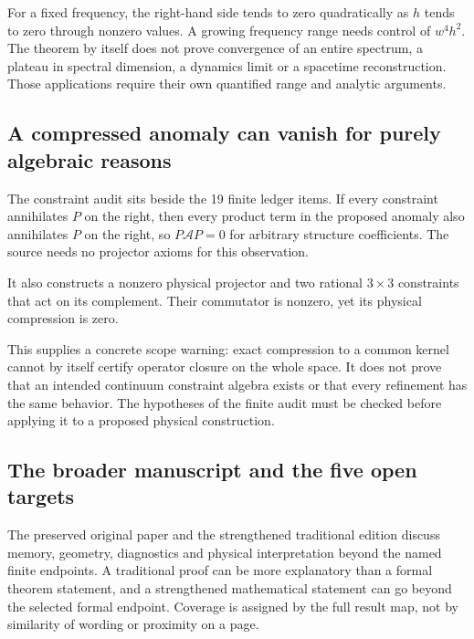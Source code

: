 

For a fixed frequency, the right-hand side tends to zero quadratically as $h$ tends to zero through nonzero values. A growing frequency range needs control of $w^4h^2$. The theorem by itself does not prove convergence of an entire spectrum, a plateau in spectral dimension, a dynamics limit or a spacetime reconstruction. Those applications require their own quantified range and analytic arguments.

\subsection{A compressed anomaly can vanish for purely algebraic reasons}
The constraint audit sits beside the 19 finite ledger items. If every constraint annihilates $P$ on the right, then every product term in the proposed anomaly also annihilates $P$ on the right, so $P\mathcal A P=0$ for arbitrary structure coefficients. The source needs no projector axioms for this observation.


It also constructs a nonzero physical projector and two rational $3\times3$ constraints that act on its complement. Their commutator is nonzero, yet its physical compression is zero.


This supplies a concrete scope warning: exact compression to a common kernel cannot by itself certify operator closure on the whole space. It does not prove that an intended continuum constraint algebra exists or that every refinement has the same behavior. The hypotheses of the finite audit must be checked before applying it to a proposed physical construction.

\subsection{The broader manuscript and the five open targets}
The preserved original paper and the strengthened traditional edition discuss memory, geometry, diagnostics and physical interpretation beyond the named finite endpoints. A traditional proof can be more explanatory than a formal theorem statement, and a strengthened mathematical statement can go beyond the selected formal endpoint. Coverage is assigned by the full result map, not by similarity of wording or proximity on a page.

